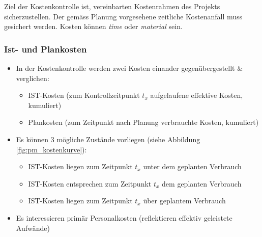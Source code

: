 \documentclass[a4paper]{article}
\begin{document}
			Ziel der Kostenkontrolle ist, vereinbarten Kostenrahmen des Projekts sicherzustellen.
			Der gemäss Planung vorgesehene zeitliche Kostenanfall muss gesichert werden.
			Kosten können \textit{time} oder \textit{material} sein.
			
		\subsubsection{Ist- und Plankosten}
		
		\begin{itemize}
			\item In der Kostenkontrolle werden zwei Kosten einander gegenübergestellt \& verglichen:
				\begin{itemize}
					\item IST-Kosten (zum Kontrollzeitpunkt $t_x$ aufgelaufene effektive Kosten, kumuliert)
					\item Plankosten (zum Zeitpunkt nach Planung verbrauchte Kosten, kumuliert)
				\end{itemize}
			\item Es können 3 mögliche Zustände vorliegen (siehe Abbildung \ref{fig:pm_kostenkurve}):
				\begin{itemize}
					\item IST-Kosten liegen zum Zeitpunkt $t_x$ unter dem geplanten Verbrauch
					\item IST-Kosten entsprechen zum Zeitpunkt $t_x$ dem geplanten Verbrauch
					\item IST-Kosten liegen zum Zeitpunkt $t_x$ über geplantem Verbrauch
				\end{itemize}
			\item Es interessieren primär Personalkosten (reflektieren effektiv geleistete Aufwände)
		\end{itemize}
	
\end{document}
